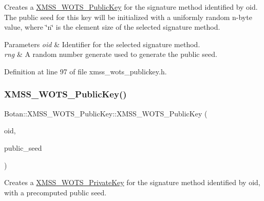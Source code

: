 Creates a \mbox{\hyperlink{class_botan_1_1_x_m_s_s___w_o_t_s___public_key}{X\+M\+S\+S\+\_\+\+W\+O\+T\+S\+\_\+\+Public\+Key}} for the signature method identified by oid. The public seed for this key will be initialized with a uniformly random n-\/byte value, where \char`\"{}n\char`\"{} is the element size of the selected signature method.


\begin{DoxyParams}{Parameters}
{\em oid} & Identifier for the selected signature method. \\
\hline
{\em rng} & A random number generate used to generate the public seed. \\
\hline
\end{DoxyParams}


Definition at line 97 of file xmss\+\_\+wots\+\_\+publickey.\+h.

\mbox{\label{class_botan_1_1_x_m_s_s___w_o_t_s___public_key_a99e8be1233998e9375321051722fa40e}} 
\subsubsection{\texorpdfstring{X\+M\+S\+S\+\_\+\+W\+O\+T\+S\+\_\+\+Public\+Key()}{XMSS\_WOTS\_PublicKey()}\hspace{0.1cm}{\footnotesize\ttfamily [3/6]}}
{\footnotesize\ttfamily Botan\+::\+X\+M\+S\+S\+\_\+\+W\+O\+T\+S\+\_\+\+Public\+Key\+::\+X\+M\+S\+S\+\_\+\+W\+O\+T\+S\+\_\+\+Public\+Key (\begin{DoxyParamCaption}\item[{X\+M\+S\+S\+\_\+\+W\+O\+T\+S\+\_\+\+Parameters\+::ots\+\_\+algorithm\+\_\+t}]{oid,  }\item[{secure\+\_\+vector$<$ uint8\+\_\+t $>$}]{public\+\_\+seed }\end{DoxyParamCaption})\hspace{0.3cm}{\ttfamily [inline]}}

Creates a \mbox{\hyperlink{class_botan_1_1_x_m_s_s___w_o_t_s___private_key}{X\+M\+S\+S\+\_\+\+W\+O\+T\+S\+\_\+\+Private\+Key}} for the signature method identified by oid, with a precomputed public seed.


